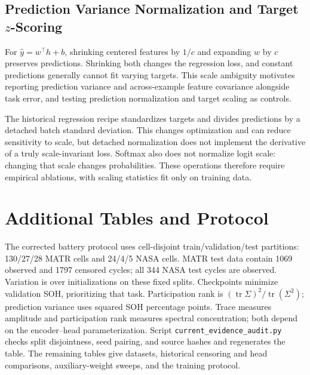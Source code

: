 \documentclass{article}
\begin{document}
\subsection{Prediction Variance Normalization and Target \texorpdfstring{$z$}{z}-Scoring}\label{app:zscore}

For $\hat y=w^\top h+b$, shrinking centered features by $1/c$ and expanding $w$ by $c$ preserves predictions. Shrinking both changes the regression loss, and constant predictions generally cannot fit varying targets. This scale ambiguity motivates reporting prediction variance and across-example feature covariance alongside task error, and testing prediction normalization and target scaling as controls.

The historical regression recipe standardizes targets and divides predictions by a detached batch standard deviation. This changes optimization and can reduce sensitivity to scale, but detached normalization does not implement the derivative of a truly scale-invariant loss. Softmax also does not normalize logit scale: changing that scale changes probabilities. These operations therefore require empirical ablations, with scaling statistics fit only on training data.

\section{Additional Tables and Protocol}\label{app:tables}

The corrected battery protocol uses cell-disjoint train/validation/test partitions: 130/27/28 MATR cells and 24/4/5 NASA cells. MATR test data contain 1069 observed and 1797 censored cycles; all 344 NASA test cycles are observed. Variation is over initializations on these fixed splits. Checkpoints minimize validation SOH, prioritizing that task. Participation rank is $(\operatorname{tr}\Sigma)^2/\operatorname{tr}(\Sigma^2)$; prediction variance uses squared SOH percentage points. Trace measures amplitude and participation rank measures spectral concentration; both depend on the encoder--head parameterization. Script \texttt{current\_evidence\_audit.py} checks split disjointness, seed pairing, and source hashes and regenerates the table. The remaining tables give datasets, historical censoring and head comparisons, auxiliary-weight sweeps, and the training protocol.

\end{document}
